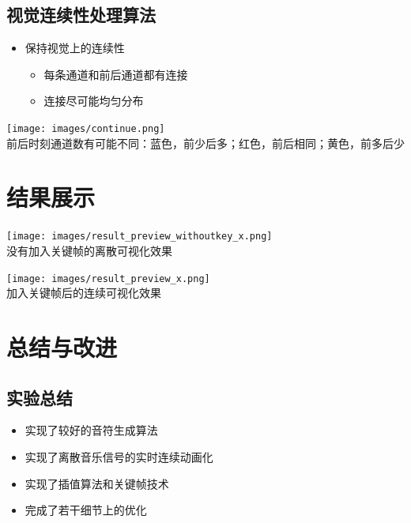 \documentclass[a4paper, 12pt]{article}
\begin{document}
\subsection{视觉连续性处理算法}

\begin{itemize}[leftmargin=*]
\item 保持视觉上的连续性
    \begin{itemize}[leftmargin=*]
    \item 每条通道和前后通道都有连接
    \item 连接尽可能均匀分布
    \end{itemize}
\end{itemize}

\begin{center}
\texttt{[image: images/continue.png]}\\
前后时刻通道数有可能不同：蓝色，前少后多；红色，前后相同；黄色，前多后少

\end{center}

\section{结果展示}

\begin{center}
\texttt{[image: images/result\_preview\_withoutkey\_x.png]}\\
没有加入关键帧的离散可视化效果
\end{center}

\begin{center}
\texttt{[image: images/result\_preview\_x.png]}\\
加入关键帧后的连续可视化效果
\end{center}

\newpage

\section{总结与改进}

\subsection{实验总结}

\begin{itemize}[leftmargin=*]
\item 实现了较好的音符生成算法
\item 实现了离散音乐信号的实时连续动画化
\item 实现了插值算法和关键帧技术
\item 完成了若干细节上的优化
\end{itemize}
\end{document}

